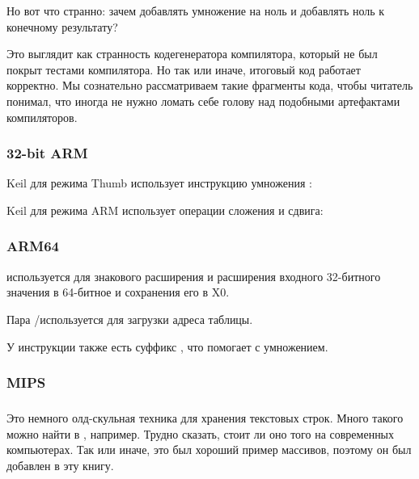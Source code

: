 

\myindex{\CompilerAnomaly}
\label{MSVC2013_anomaly}
Но вот что странно: зачем добавлять умножение на ноль и добавлять ноль к конечному результату?

Это выглядит как странность кодегенератора компилятора, который не был покрыт тестами
компилятора. Но так или иначе, итоговый код работает корректно.
Мы сознательно рассматриваем такие фрагменты кода, чтобы читатель понимал, что иногда не нужно
ломать себе голову над подобными артефактами компиляторов.

\subsubsection{32-bit ARM}

\Optimizing Keil для режима Thumb использует инструкцию умножения :



\Optimizing Keil для режима ARM использует операции сложения и сдвига:



\subsubsection{ARM64}



 используется для знакового расширения и расширения
входного 32-битного значения в 64-битное и сохранения его в X0.

Пара \ADRP/\ADD используется для загрузки адреса таблицы.

У инструкции \ADD также есть суффикс \LSL, что помогает с умножением.

\subsubsection{MIPS}


\subsubsection{\Conclusion{}}

Это немного олд-скульная техника для хранения текстовых строк.
Много такого можно найти в \oracle, например.
Трудно сказать, стоит ли оно того на современных компьютерах.
Так или иначе, это был хороший пример массивов, поэтому он был добавлен в эту книгу.

